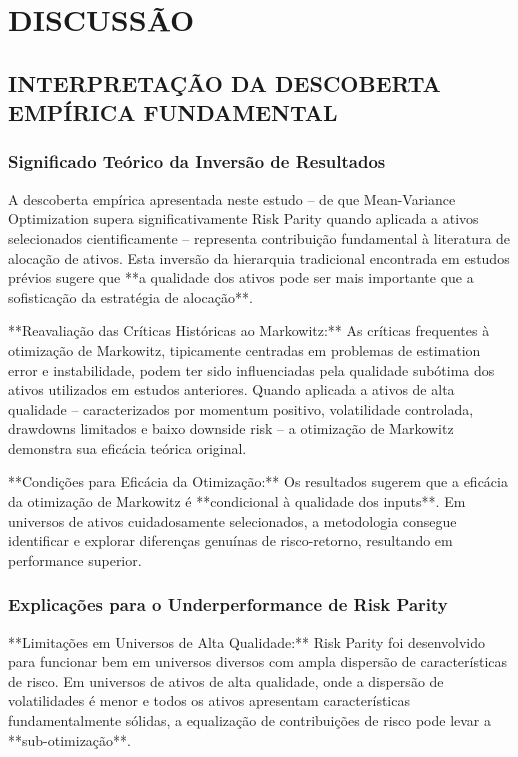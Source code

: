 
\chapter{DISCUSSÃO}

\section{INTERPRETAÇÃO DA DESCOBERTA EMPÍRICA FUNDAMENTAL}

\subsection{Significado Teórico da Inversão de Resultados}

A descoberta empírica apresentada neste estudo – de que Mean-Variance Optimization supera significativamente Risk Parity quando aplicada a ativos selecionados cientificamente – representa contribuição fundamental à literatura de alocação de ativos. Esta inversão da hierarquia tradicional encontrada em estudos prévios sugere que **a qualidade dos ativos pode ser mais importante que a sofisticação da estratégia de alocação**.

**Reavaliação das Críticas Históricas ao Markowitz:** As críticas frequentes à otimização de Markowitz, tipicamente centradas em problemas de estimation error e instabilidade, podem ter sido influenciadas pela qualidade subótima dos ativos utilizados em estudos anteriores. Quando aplicada a ativos de alta qualidade – caracterizados por momentum positivo, volatilidade controlada, drawdowns limitados e baixo downside risk – a otimização de Markowitz demonstra sua eficácia teórica original.

**Condições para Eficácia da Otimização:** Os resultados sugerem que a eficácia da otimização de Markowitz é **condicional à qualidade dos inputs**. Em universos de ativos cuidadosamente selecionados, a metodologia consegue identificar e explorar diferenças genuínas de risco-retorno, resultando em performance superior.

\subsection{Explicações para o Underperformance de Risk Parity}

**Limitações em Universos de Alta Qualidade:** Risk Parity foi desenvolvido para funcionar bem em universos diversos com ampla dispersão de características de risco. Em universos de ativos de alta qualidade, onde a dispersão de volatilidades é menor e todos os ativos apresentam características fundamentalmente sólidas, a equalização de contribuições de risco pode levar a **sub-otimização**.

